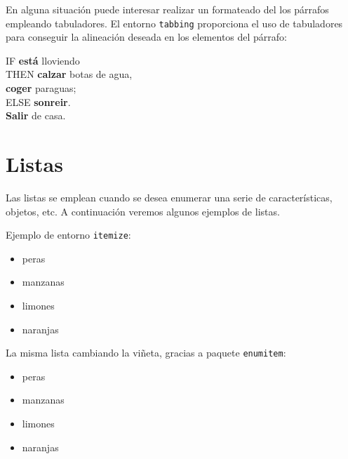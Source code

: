 En alguna situación puede interesar realizar un formateado del los párrafos empleando tabuladores. El entorno \texttt{tabbing} proporciona el uso de tabuladores para conseguir la alineación deseada en los elementos del párrafo:

\begin{tabbing}
	IF \= \textbf{está} lloviendo                \\
	\> THEN \= \textbf{calzar} botas de agua, \\
	\>      \> \textbf{coger} paraguas;       \\
	\> ELSE \> \textbf{sonreir}.              \\
	\textbf{Salir} de casa.
\end{tabbing}







\section{Listas}
\label{sec:listas} %


Las listas se emplean cuando se desea enumerar una serie de características, objetos, etc. A continuación veremos algunos ejemplos de listas.

\noindent Ejemplo de entorno {\tt itemize}:

\begin{itemize}
	\item peras
	\item manzanas
	\item limones
	\item naranjas
\end{itemize}

\noindent La misma lista cambiando la viñeta, gracias a paquete \texttt{enumitem}:
\begin{itemize}[]
	\item peras
	\item manzanas
	\item limones
	\item naranjas
\end{itemize}


